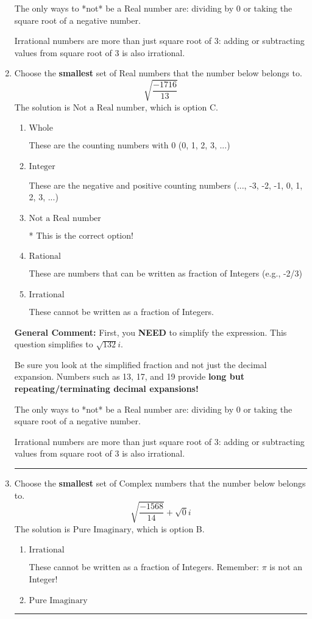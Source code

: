 \documentclass{extbook}[14pt]
\newcommand{\litem}[1]{\item #1

\rule{\textwidth}{0.4pt}}
\begin{document}
\begin{enumerate}
{ The only ways to *not* be a Real number are: dividing by 0 or taking the square root of a negative number. 
 
 Irrational numbers are more than just square root of 3: adding or subtracting values from square root of 3 is also irrational.
}
\litem{
Choose the \textbf{smallest} set of Real numbers that the number below belongs to.
\[ \sqrt{\frac{-1716}{13}} \]The solution is \( \text{Not a Real number} \), which is option C.\begin{enumerate}[label=\Alph*.]
\item \( \text{Whole} \)

These are the counting numbers with 0 (0, 1, 2, 3, ...)
\item \( \text{Integer} \)

These are the negative and positive counting numbers (..., -3, -2, -1, 0, 1, 2, 3, ...)
\item \( \text{Not a Real number} \)

* This is the correct option!
\item \( \text{Rational} \)

These are numbers that can be written as fraction of Integers (e.g., -2/3)
\item \( \text{Irrational} \)

These cannot be written as a fraction of Integers.
\end{enumerate}

\textbf{General Comment:} First, you \textbf{NEED} to simplify the expression. This question simplifies to $\sqrt{132} i$. 
 
 Be sure you look at the simplified fraction and not just the decimal expansion. Numbers such as 13, 17, and 19 provide \textbf{long but repeating/terminating decimal expansions!} 
 
 The only ways to *not* be a Real number are: dividing by 0 or taking the square root of a negative number. 
 
 Irrational numbers are more than just square root of 3: adding or subtracting values from square root of 3 is also irrational.
}
\litem{
Choose the \textbf{smallest} set of Complex numbers that the number below belongs to.
\[ \sqrt{\frac{-1568}{14}}+\sqrt{0}i \]The solution is \( \text{Pure Imaginary} \), which is option B.\begin{enumerate}[label=\Alph*.]
\item \( \text{Irrational} \)

These cannot be written as a fraction of Integers. Remember: $\pi$ is not an Integer!
\item \( \text{Pure Imaginary} \)


\end{enumerate}}
\end{enumerate}
\end{document}
